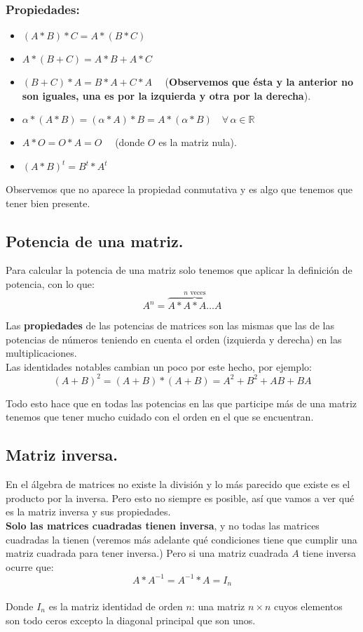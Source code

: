 \documentclass[a4paper,11pt,answers]{exam}
\begin{document}
\subsubsection{Propiedades:}
\begin{itemize}
	\item $(A*B)*C = A*(B*C)$
	\item $A*(B+C) = A*B+A*C$
	\item $(B+C)*A = B*A + C*A\quad$ (\textbf{Observemos que ésta y la anterior no son iguales, una es por la izquierda y otra por la derecha}).
	\item $\alpha*(A*B) = (\alpha*A)*B = A*(\alpha*B) \quad \forall\,\alpha \in \mathbb{R}$
	\item $A*O = O*A = O\quad$ (donde $O$ es la matriz nula).
	\item $(A*B)^t = B^t * A^t$ 
\end{itemize}
Observemos que no aparece la propiedad conmutativa y es algo que tenemos que tener bien presente.

\subsection{Potencia de una matriz.}
Para calcular la potencia de una matriz solo tenemos que aplicar la definición de potencia, con lo que:
\[A^n = \overbrace{A*A*A\dots A}^{n \text{ veces}}\]

Las \textbf{propiedades} de las potencias de matrices son las mismas que las de las potencias de números teniendo en cuenta el orden (izquierda y derecha) en las multiplicaciones.\\
Las identidades notables cambian un poco por este hecho, por ejemplo:
\[(A+B)^2 = (A+B)*(A+B) = A^2 + B^2 + AB + BA\]

Todo esto hace que en todas las potencias en las que participe más de una matriz tenemos que tener mucho cuidado con el orden en el que se encuentran.
\subsection{Matriz inversa.}
En el álgebra de matrices no existe la división y lo más parecido que existe es el producto por la inversa.
Pero esto no siempre es posible, así que vamos a ver qué es la matriz inversa y sus propiedades.\\

\textbf{Solo las matrices cuadradas tienen inversa}, y no todas las matrices cuadradas la tienen (veremos más adelante qué condiciones
tiene que cumplir una matriz cuadrada para tener inversa.) Pero si una matriz cuadrada $A$ tiene inversa ocurre que:
\[A*A^{-1} = A^{-1}*A = I_n\]\\
Donde $I_n$ es la matriz identidad de orden $n$: una matriz $n\times n$ cuyos elementos son todo ceros excepto la diagonal
principal que son unos.\\
\end{document}
